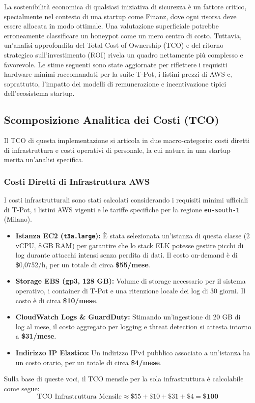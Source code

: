 La sostenibilità economica di qualsiasi iniziativa di sicurezza è un fattore critico, specialmente nel contesto di una startup come Finanz, dove ogni risorsa deve essere allocata in modo ottimale. Una valutazione superficiale potrebbe erroneamente classificare un honeypot come un mero centro di costo. Tuttavia, un'analisi approfondita del Total Cost of Ownership (TCO) e del ritorno strategico sull'investimento (ROI) rivela un quadro nettamente più complesso e favorevole. Le stime seguenti sono state aggiornate per riflettere i requisiti hardware minimi raccomandati per la suite T-Pot, i listini prezzi di AWS e, soprattutto, l'impatto dei modelli di remunerazione e incentivazione tipici dell'ecosistema startup.

\subsection{Scomposizione Analitica dei Costi (TCO)}
Il TCO di questa implementazione si articola in due macro-categorie: costi diretti di infrastruttura e costi operativi di personale, la cui natura in una startup merita un'analisi specifica.

\subsubsection{Costi Diretti di Infrastruttura AWS}
I costi infrastrutturali sono stati calcolati considerando i requisiti minimi ufficiali di T-Pot, i listini AWS vigenti e le tariffe specifiche per la regione \texttt{eu-south-1} (Milano).
\begin{itemize}
    \item \textbf{Istanza EC2 (\texttt{t3a.large}):} È stata selezionata un'istanza di questa classe (2 vCPU, 8\,GB RAM) per garantire che lo stack ELK potesse gestire picchi di log durante attacchi intensi senza perdita di dati. Il costo on-demand è di \$0,0752/h, per un totale di circa \textbf{\$55/mese}.
    \item \textbf{Storage EBS (gp3, 128 GB):} Volume di storage necessario per il sistema operativo, i container di T-Pot e una ritenzione locale dei log di 30 giorni. Il costo è di circa \textbf{\$10/mese}.
    \item \textbf{CloudWatch Logs \& GuardDuty:} Stimando un'ingestione di 20 GB di log al mese, il costo aggregato per logging e threat detection si attesta intorno a \textbf{\$31/mese}.
    \item \textbf{Indirizzo IP Elastico:} Un indirizzo IPv4 pubblico associato a un'istanza ha un costo orario, per un totale di circa \textbf{\$4/mese}.
\end{itemize}
Sulla base di queste voci, il TCO mensile per la sola infrastruttura è calcolabile come segue:
\[
\boxed{\text{TCO Infrastruttura Mensile} \approx \$55 + \$10 + \$31 + \$4 = \textbf{\$100}}
\]

